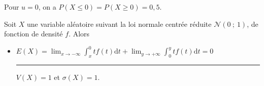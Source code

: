 \documentclass{cornouaille}
\begin{document}
\begin{remarque}
Pour $u=0$, on a $P(X\leqslant 0)=P(X\geqslant 0)=0,5$.
\end{remarque}



\begin{propriete}
Soit $X$ une variable aléatoire suivant la loi normale centrée réduite $\mathcal{N}(0\ ;\ 1)$, de fonction de densité $f$. Alors

\begin{itemize}
\item $E(X)=\displaystyle \lim_{x \rightarrow -\infty}
\int_x^0 tf(t)\textrm{d} t+ \displaystyle \lim_{y
\rightarrow +\infty} \int_0^y tf(t)\textrm{d} t=0$
\qquad
\textcolor{DefSquareColor}{\rule{1.5mm}{1.5mm}}\hspace{2mm}
$V(X)=1$ et $\sigma(X)=1$.
\end{itemize}

\end{propriete}
\end{document}
